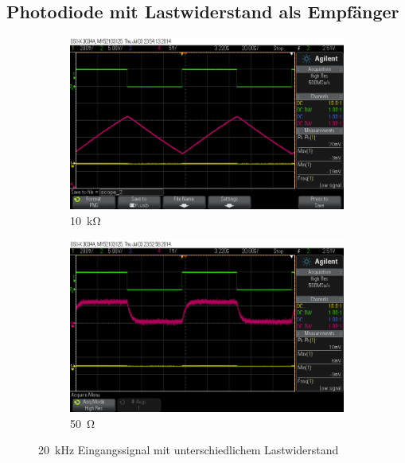 \documentclass[12pt,a4paper]{article}
\begin{document}
\subsection{Photodiode mit Lastwiderstand als Empfänger}
\label{sec:direct_rx}

\begin{figure}[h]
  \centering
  \begin{subfigure}[b]{0.6\textwidth}
    \includegraphics[width=\textwidth]{../measurements/20140703/20kHz_10kOhm/scope_2.png}
    \caption{\SI{10}{\kilo\ohm}}
    \label{fig:direct_rx_10k_R}
  \end{subfigure}  
  \begin{subfigure}[b]{0.6\textwidth}
    \includegraphics[width=\textwidth]{../measurements/20140703/20kHz_50_Ohm/scope_0.png}
    \caption{\SI{50}{\ohm}}
    \label{fig:direct_rx_50_R}
  \end{subfigure}  
  \caption{\SI{20}{\kilo\hertz} Eingangssignal mit unterschiedlichem Lastwiderstand}
  \label{fig:direct_rx}
\end{figure}
\end{document}
